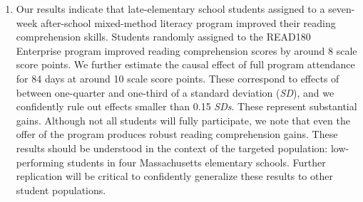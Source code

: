 \documentclass[a4paper, 11pt]{article}
\begin{document}
\begin{enumerate}
	

	\item[B5.] Our results indicate that late-elementary school students assigned to a seven-week after-school mixed-method literacy program improved their reading comprehension skills. Students randomly assigned to the READ180 Enterprise program improved reading comprehension scores by around 8 scale score points. We further estimate the causal effect of full program attendance for 84 days at around 10 scale score points. These correspond to effects of between one-quarter and one-third of a standard deviation (\textit{SD}), and we confidently rule out effects smaller than 0.15 \textit{SDs}. These represent substantial gains. Although not all students will fully participate, we note that even the offer of the program produces robust reading comprehension gains. These results should be understood in the context of the targeted population: low-performing students in four Massachusetts elementary schools. Further replication will be critical to confidently generalize these results to other student populations. 

\end{enumerate}
\end{document}
